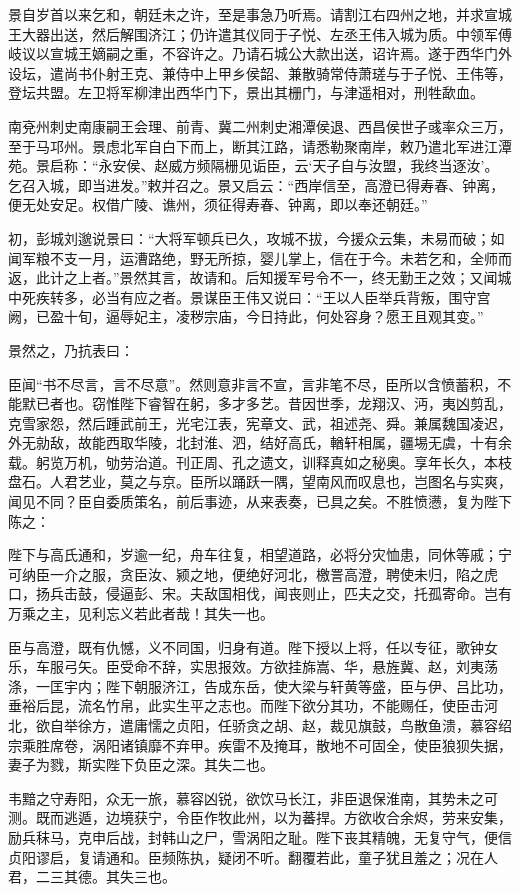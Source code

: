 \documentclass[12pt,UTF8]{ctexbook}
\begin{document}
景自岁首以来乞和，朝廷未之许，至是事急乃听焉。请割江右四州之地，并求宣城王大器出送，然后解围济江；仍许遣其仪同于子悦、左丞王伟入城为质。中领军傅岐议以宣城王嫡嗣之重，不容许之。乃请石城公大款出送，诏许焉。遂于西华门外设坛，遣尚书仆射王克、兼侍中上甲乡侯韶、兼散骑常侍萧瑳与于子悦、王伟等，登坛共盟。左卫将军柳津出西华门下，景出其栅门，与津遥相对，刑牲歃血。

南兗州刺史南康嗣王会理、前青、冀二州刺史湘潭侯退、西昌侯世子彧率众三万，至于马邛州。景虑北军自白下而上，断其江路，请悉勒聚南岸，敕乃遣北军进江潭苑。景启称：“永安侯、赵威方频隔栅见诟臣，云‘天子自与汝盟，我终当逐汝’。乞召入城，即当进发。”敕并召之。景又启云：“西岸信至，高澄已得寿春、钟离，便无处安足。权借广陵、谯州，须征得寿春、钟离，即以奉还朝廷。”

初，彭城刘邈说景曰：“大将军顿兵已久，攻城不拔，今援众云集，未易而破；如闻军粮不支一月，运漕路绝，野无所掠，婴儿掌上，信在于今。未若乞和，全师而返，此计之上者。”景然其言，故请和。后知援军号令不一，终无勤王之效；又闻城中死疾转多，必当有应之者。景谋臣王伟又说曰：“王以人臣举兵背叛，围守宫阙，已盈十旬，逼辱妃主，凌秽宗庙，今日持此，何处容身？愿王且观其变。”

景然之，乃抗表曰：

臣闻“书不尽言，言不尽意”。然则意非言不宣，言非笔不尽，臣所以含愤蓄积，不能默已者也。窃惟陛下睿智在躬，多才多艺。昔因世季，龙翔汉、沔，夷凶剪乱，克雪家怨，然后踵武前王，光宅江表，宪章文、武，祖述尧、舜。兼属魏国凌迟，外无勍敌，故能西取华陵，北封淮、泗，结好高氏，輶轩相属，疆埸无虞，十有余载。躬览万机，劬劳治道。刊正周、孔之遗文，训释真如之秘奥。享年长久，本枝盘石。人君艺业，莫之与京。臣所以踊跃一隅，望南风而叹息也，岂图名与实爽，闻见不同？臣自委质策名，前后事迹，从来表奏，已具之矣。不胜愤懑，复为陛下陈之：

陛下与高氏通和，岁逾一纪，舟车往复，相望道路，必将分灾恤患，同休等戚；宁可纳臣一介之服，贪臣汝、颍之地，便绝好河北，檄詈高澄，聘使未归，陷之虎口，扬兵击鼓，侵逼彭、宋。夫敌国相伐，闻丧则止，匹夫之交，托孤寄命。岂有万乘之主，见利忘义若此者哉！其失一也。

臣与高澄，既有仇憾，义不同国，归身有道。陛下授以上将，任以专征，歌钟女乐，车服弓矢。臣受命不辞，实思报效。方欲挂旆嵩、华，悬旌冀、赵，刘夷荡涤，一匡宇内；陛下朝服济江，告成东岳，使大梁与轩黄等盛，臣与伊、吕比功，垂裕后昆，流名竹帛，此实生平之志也。而陛下欲分其功，不能赐任，使臣击河北，欲自举徐方，遣庸懦之贞阳，任骄贪之胡、赵，裁见旗鼓，鸟散鱼溃，慕容绍宗乘胜席卷，涡阳诸镇靡不弃甲。疾雷不及掩耳，散地不可固全，使臣狼狈失据，妻子为戮，斯实陛下负臣之深。其失二也。

韦黯之守寿阳，众无一旅，慕容凶锐，欲饮马长江，非臣退保淮南，其势未之可测。既而逃遁，边境获宁，令臣作牧此州，以为蕃捍。方欲收合余烬，劳来安集，励兵秣马，克申后战，封韩山之尸，雪涡阳之耻。陛下丧其精魄，无复守气，便信贞阳谬启，复请通和。臣频陈执，疑闭不听。翻覆若此，童子犹且羞之；况在人君，二三其德。其失三也。
\end{document}
